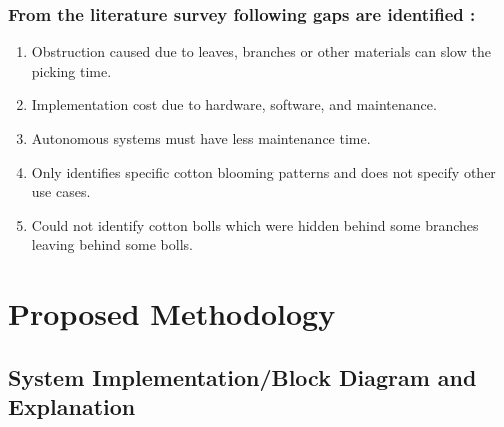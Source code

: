 \documentclass[12pt,a4paper]{report}
\begin{document}
\subsection {{\bf{ From the literature survey following gaps are identified :}}} 
 
\begin{enumerate}
    \item Obstruction caused due to leaves, branches or other materials can slow the picking time.
    \item Implementation cost due to hardware, software, and maintenance.
    \item Autonomous systems must have less maintenance time.
    \item Only identifies specific cotton blooming patterns and does not specify other use cases. 
    \item Could not identify cotton bolls which were hidden behind some branches leaving behind some bolls. 
\end{enumerate}










\chapter{Proposed Methodology }





\section {System Implementation/Block Diagram and Explanation}
 
\end{document}
